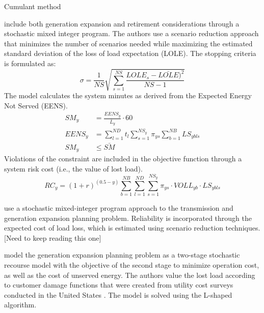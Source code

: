 \documentclass[10pt]{amsart}
\begin{document}
Cumulant method
\cite{kothari2009optimal, stremel1980production, sirikum2006power}

\cite{tohidi2013generation} include both generation expansion and retirement considerations through a stochastic mixed integer program.
The authors use a scenario reduction approach that minimizes the number of scenarios needed while maximizing the estimated standard deviation of the loss of load expectation (LOLE). 
The stopping criteria is formulated as:
\begin{equation}
\sigma = \frac{1}{NS}\sqrt{\sum_{s=1}^{NS}\frac{LOLE_{s}-\bar{LOLE})^2}{NS-1}}
\end{equation}
The model calculates the system minutes as derived from the Expected Energy Not Served (EENS). 
\begin{equation}
\begin{split}
SM_{y} &= \frac{EENS_{y}}{\bar{L}_{y}}\cdot 60 \\
EENS_{y} &= \sum_{l=1}^{ND} t_{l} \sum_{s=1}^{NS_y} \pi_{ys} \sum_{b=1}^{NB} LS_{ybls} \\
SM_{y} &\leq \bar{SM}
\end{split}
\end{equation}
Violations of the constraint are included in the objective function through a system risk cost (i.e., the value of lost load).
\begin{equation}
RC_{y} = (1+r)^{(0.5-y)}\sum_{b=1}^{NB}\sum_{l=1}^{ND}\sum_{s=1}^{NS_y} \pi_{ys} \cdot VOLL_{yb} \cdot LS_{ybls}
\end{equation}

\cite{jirutitijaroen2008reliability} use a stochastic mixed-integer program approach to the transmission and generation expansion planning problem.
Reliability is incorporated through the expected cost of load loss, which is estimated using scenario reduction techniques.
[Need to keep reading this one] 

\cite{jirutitijaroen2007stochastic} model the generation expansion planning problem as a two-stage stochastic recourse model with the objective of the second stage to minimize operation cost, as well as the cost of unserved energy.
The authors value the lost load according to customer damage functions that were created from utility cost surveys conducted in the United States \parencite{lawton2003framework}. 
The model is solved using the L-shaped algorithm.

\printbibliography
\end{document}
